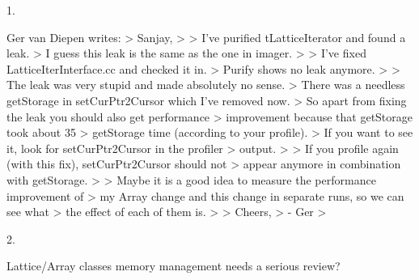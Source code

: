 1.

Ger van Diepen writes:
 > Sanjay,
 >
 > I've purified tLatticeIterator and found a leak.
 > I guess this leak is the same as the one in imager.
 >
 > I've fixed LatticeIterInterface.cc and checked it in.
 > Purify shows no leak anymore.
 >
 > The leak was very stupid and made absolutely no sense.
 > There was a needless getStorage in setCurPtr2Cursor which I've removed now.
 > So apart from fixing the leak you should also get performance
 > improvement because that getStorage took about 35%
 > getStorage time (according to your profile).
 > If you want to see it, look for setCurPtr2Cursor in the profiler
 > output.
 >
 > If you profile again (with this fix), setCurPtr2Cursor should not
 > appear anymore in combination with getStorage.
 >
 > Maybe it is a good idea to measure the performance improvement of
 > my Array change and this change in separate runs, so we can see what
 > the effect of each of them is.
 >
 > Cheers,
 > - Ger
 >

2.

Lattice/Array classes memory management needs a serious review?
